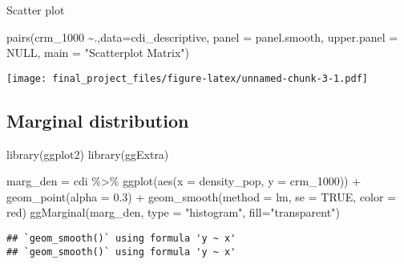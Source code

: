 \documentclass[
]{article}
\newenvironment{Shaded}{\begin{snugshade}}{\end{snugshade}}
\newcommand{\AttributeTok}[1]{\textcolor[rgb]{0.77,0.63,0.00}{#1}}
\newcommand{\ConstantTok}[1]{\textcolor[rgb]{0.00,0.00,0.00}{#1}}
\newcommand{\FloatTok}[1]{\textcolor[rgb]{0.00,0.00,0.81}{#1}}
\newcommand{\FunctionTok}[1]{\textcolor[rgb]{0.00,0.00,0.00}{#1}}
\newcommand{\NormalTok}[1]{#1}
\newcommand{\OtherTok}[1]{\textcolor[rgb]{0.56,0.35,0.01}{#1}}
\newcommand{\SpecialCharTok}[1]{\textcolor[rgb]{0.00,0.00,0.00}{#1}}
\newcommand{\StringTok}[1]{\textcolor[rgb]{0.31,0.60,0.02}{#1}}
\begin{document}
Scatter plot

\begin{Shaded}
\begin{Highlighting}[]
\FunctionTok{pairs}\NormalTok{(crm\_1000 }\SpecialCharTok{\textasciitilde{}}\NormalTok{.,}\AttributeTok{data=}\NormalTok{cdi\_descriptive, }\AttributeTok{panel =}\NormalTok{ panel.smooth, }\AttributeTok{upper.panel =} \ConstantTok{NULL}\NormalTok{, }\AttributeTok{main =} \StringTok{"Scatterplot Matrix"}\NormalTok{)}
\end{Highlighting}
\end{Shaded}

\texttt{[image: final\_project\_files/figure-latex/unnamed-chunk-3-1.pdf]}

\hypertarget{marginal-distribution}{%
\subsection{Marginal distribution}\label{marginal-distribution}}

\begin{Shaded}
\begin{Highlighting}[]
\FunctionTok{library}\NormalTok{(ggplot2)}
\FunctionTok{library}\NormalTok{(ggExtra)}
\end{Highlighting}
\end{Shaded}

\begin{Shaded}
\begin{Highlighting}[]
\NormalTok{marg\_den }\OtherTok{=}\NormalTok{ cdi }\SpecialCharTok{\%\textgreater{}\%} \FunctionTok{ggplot}\NormalTok{(}\FunctionTok{aes}\NormalTok{(}\AttributeTok{x =}\NormalTok{ density\_pop, }\AttributeTok{y =}\NormalTok{ crm\_1000)) }\SpecialCharTok{+} \FunctionTok{geom\_point}\NormalTok{(}\AttributeTok{alpha =} \FloatTok{0.3}\NormalTok{) }\SpecialCharTok{+} \FunctionTok{geom\_smooth}\NormalTok{(}\AttributeTok{method =} \StringTok{\textquotesingle{}lm\textquotesingle{}}\NormalTok{, }\AttributeTok{se =} \ConstantTok{TRUE}\NormalTok{, }\AttributeTok{color =} \StringTok{\textquotesingle{}red\textquotesingle{}}\NormalTok{)}
\FunctionTok{ggMarginal}\NormalTok{(marg\_den, }\AttributeTok{type =} \StringTok{"histogram"}\NormalTok{, }\AttributeTok{fill=}\StringTok{"transparent"}\NormalTok{)}
\end{Highlighting}
\end{Shaded}

\begin{verbatim}
## `geom_smooth()` using formula 'y ~ x'
## `geom_smooth()` using formula 'y ~ x'
\end{verbatim}
\end{document}
